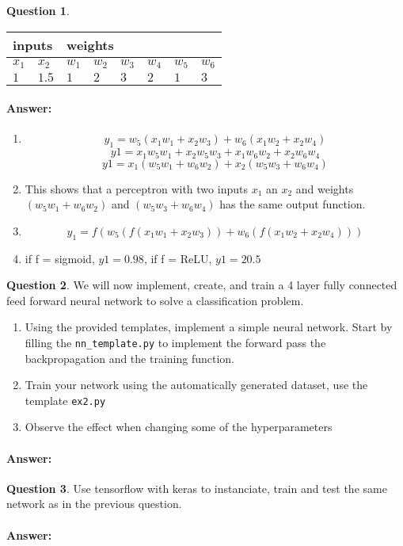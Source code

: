 \documentclass[11pt,a4paper]{article}
\theoremstyle{definition}%
\newtheorem{Q}{Question}[] %
\newcommand{\reponse}[1]{%
\ifthenelse {\boolean{corrige}} {\paragraph{Answer:} \color{darkblue}   #1\color{black}} {}
}
\begin{document}
\begin{Q}
\begin{enumerate}
    \begin{center}
    \begin{tabular}{|l|l|l|l|l|l|l|l|}
    \hline
    \multicolumn{2}{|l|}{inputs} & \multicolumn{6}{l|}{weights}                  \\ \hline
    $x_1$         & $x_2$        & $w_1$ & $w_2$ & $w_3$ & $w_4$ & $w_5$ & $w_6$ \\ \hline
    $1$           & $1.5$        & $1$   & $2$   & $3$   & $2$   & $1$   & $3$   \\ \hline
    \end{tabular}
    \end{center}

\end{enumerate}

\reponse{

\begin{enumerate}
    \item $$y_1 = w_5 ( x_1 w_1 + x_2 w_3 ) + w_6 ( x_1 w_2 + x_2 w_4 )$$
        $$y1 = x_1 w_5 w_1 + x_2 w_5 w_3 + x_1 w_6 w_2 + x_2 w_6 w_4$$
        $$y1 = x_1 (w_5 w_1 + w_6 w_2) + x_2 (w_5 w_3 + w_6 w_4)  $$
    \item This shows that a perceptron with two inputs $x_1$ an $x_2$ and weights 
        $(w_5 w_1 + w_6 w_2)$ and $(w_5 w_3 + w_6 w_4)$ has the same output function.
    \item $$y_1 = f(w_5 ( f(x_1 w_1 + x_2 w_3 )) + w_6 ( f(x_1 w_2 + x_2 w_4 )))$$
    \item if f = sigmoid, $y1 = 0.98$, if f = ReLU, $y1 = 20.5$

\end{enumerate}

}

\end{Q}

\begin{Q}
    We will now implement, create, and train a 4 layer fully connected feed forward neural network
    to solve a classification problem.
    \begin{enumerate}
        \item Using the provided templates, implement a simple neural network.
            Start by filling the \verb!nn_template.py! to implement the forward pass
            the backpropagation and the training function.
        \item Train your network using the automatically generated dataset, use the template \verb!ex2.py!
        \item Observe the effect when changing some of the hyperparameters 
    \end{enumerate}
    \reponse{

    }
\end{Q}

\begin{Q}
    Use tensorflow with keras to instanciate, train and test the same network as in the
    previous question.

    \reponse{}
\end{Q}
\end{document}
